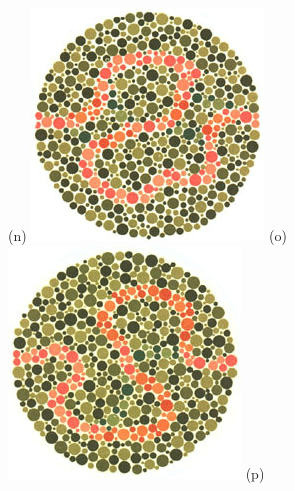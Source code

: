 \documentclass[	12pt, Times, openright, twoside, a4paper, english, brazil]{abntex2}
\begin{document}
\begin{apendicesenv}
\begin{figure}[!htb]
(n)
\endminipage\hfill
{}
\centering
{\includegraphics[width=\linewidth]{ishihara-fuga/plate36.png}}
(o)
\endminipage\hfill
{}
\centering
{\includegraphics[width=\linewidth]{ishihara-fuga/plate37.png}}
(p)
\endminipage\hfill



\end{figure}
\end{apendicesenv}
\end{document}
